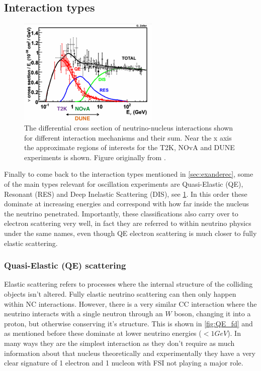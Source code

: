 \documentclass[a4paper,12pt]{article}
\begin{document}
\subsection{Interaction types}
\begin{figure}[H]
    \centering
    \includegraphics[width=0.6\textwidth]{figures/sigmaVsEnu.pdf}
    \caption{
        The differential cross section of neutrino-nucleus interactions shown for different interaction mechanisms and their sum.
        Near the x axis the approximate regions of interests for the T2K, NOvA and DUNE experiments is shown.
        Figure originally from \cite{formaggioEVEeVNeutrino2012}.
    }\label{fig:nusigma_vs_Enu}
\end{figure}

Finally to come back to the interaction types mentioned in \cref{sec:exanderec}, some of the main types relevant for oscillation experiments are Quasi-Elastic (QE), Resonant (RES) and Deep Inelastic Scattering (DIS), see \cref{fig:nusigma_vs_Enu}.
In this order these dominate at increasing energies and correspond with how far inside the nucleus the neutrino penetrated.
Importantly, these classifications also carry over to electron scattering very well, in fact they are referred to within neutrino physics under the same names, even though QE electron scattering is much closer to fully elastic scattering.

\subsubsection{Quasi-Elastic (QE) scattering}
Elastic scattering refers to processes where the internal structure of the colliding objects isn't altered.
Fully elastic neutrino scattering can then only happen within NC interactions.
However, there is a very similar CC interaction where the neutrino interacts with a single neutron through an $W$ boson, changing it into a proton, but otherwise conserving it's structure.
This is shown in \cref{fig:QE_fd} and as mentioned before these dominate at lower neutrino energies ($< 1\si{GeV}$).
In many ways they are the simplest interaction as they don't require as much information about that nucleus theoretically and experimentally they have a very clear signature of 1 electron and 1 nucleon with FSI not playing a major role.
\end{document}
